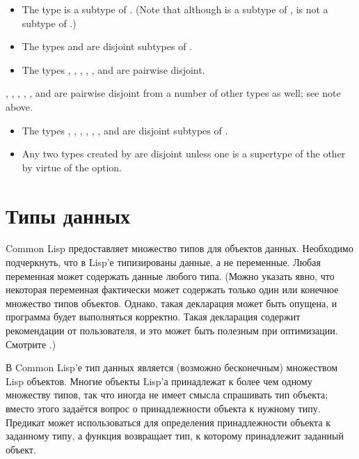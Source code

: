 \begin{itemize}
\item
The type  is a subtype of .
(Note that although  is a subtype of ,
 is not a subtype of .)

\item
The types  and  are disjoint subtypes of .

\item
The types , , , ,
, and  are pairwise disjoint.
\end{itemize}

, , , ,
, and  are
pairwise disjoint from a number of other types as well;
see note above.

\begin{itemize}
\item
The types , ,
, , , , and
 are disjoint subtypes of .
\end{itemize}

\begin{itemize}
\item
Any two types created by  are disjoint unless
one is a supertype of the other by virtue of
the  option.
\end{itemize}

\else

\chapter{Типы данных}
\label{DTYPES}

Common Lisp предоставляет множество типов для объектов
данных. Необходимо подчеркнуть, что в Lisp'е типизированы данные,
а не переменные. Любая переменная может содержать данные любого
типа. (Можно указать явно, что некоторая переменная фактически
может содержать только один или конечное множество типов
объектов. Однако, такая декларация может быть опущена, и программа
будет выполняться корректно. Такая декларация содержит
рекомендации от пользователя, и это может быть полезным при
оптимизации. Смотрите .)

В Common Lisp'е тип данных является (возможно бесконечным)
множеством Lisp объектов. Многие объекты Lisp'а принадлежат к
более чем одному множеству типов, так что иногда не имеет смысла
спрашивать тип объекта; вместо этого задаётся вопрос о
принадлежности объекта к нужному типу. Предикат  может
использоваться для определения принадлежности объекта к заданному
типу, а функция  возвращает тип, к которому
принадлежит заданный объект.

